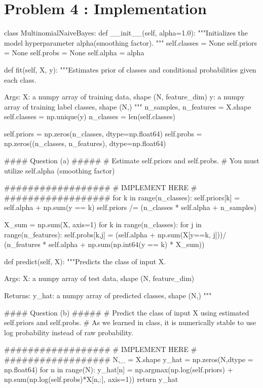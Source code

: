 \documentclass[10pt]{article}
\begin{document}
\section{Problem 4 : Implementation}
\begin{python}
class MultinomialNaiveBayes:
    def __init__(self, alpha=1.0):
        """Initializes the model hyperparameter alpha(smoothing factor).
        """
        self.classes = None
        self.priors = None
        self.probs = None
        self.alpha = alpha

    def fit(self, X, y):
        """Estimates prior of classes and conditional probabilities given each class.

        Args:
            X: a numpy array of training data, shape (N, feature_dim)
            y: a numpy array of training label classes, shape (N,)
        """
        n_samples, n_features = X.shape
        self.classes = np.unique(y)
        n_classes = len(self.classes)

        self.priors = np.zeros(n_classes, dtype=np.float64)
        self.probs = np.zeros((n_classes, n_features), dtype=np.float64)

        #### Question (a) #####
        # Estimate self.priors and self.probs.
        # You must utilize self.alpha (smoothing factor)

        ##################
        # IMPLEMENT HERE #
        ##################
        for k in range(n_classes):
            self.priors[k] = self.alpha + np.sum(y == k)
        self.priors /= (n_classes * self.alpha + n_samples)

        X_sum = np.sum(X, axis=1)
        for k in range(n_classes):
            for j in range(n_features):
                self.probs[k,j] = (self.alpha + np.sum(X[y==k, j]))/ (n_features * self.alpha + np.sum(np.int64(y == k) * X_sum))

    def predict(self, X):
        """Predicts the class of input X.

        Args:
            X: a numpy array of test data, shape (N, feature_dim)

        Returns:
            y_hat: a numpy array of predicted classes, shape (N,)
        """

        #### Question (b) #####
        # Predict the class of input X using estimated self.priors and self.probs.
        # As we learned in class, it is numerically stable to use log probability instead of raw probability.

        ##################
        # IMPLEMENT HERE #
        ##################
        N,_ = X.shape
        y_hat = np.zeros(N,dtype = np.float64)
        for n in range(N):
            y_hat[n] = np.argmax(np.log(self.priors) + np.sum(np.log(self.probs)*X[n,:], axis=1))
        return y_hat
       
\end{python}
\end{document}
